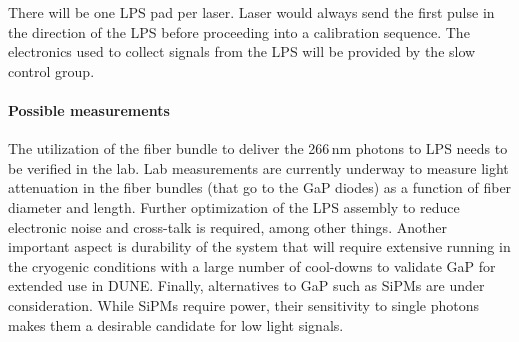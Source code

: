 There will be one LPS pad per laser. Laser would always send the first pulse in the direction of the LPS before proceeding into a calibration sequence.
 The electronics used to collect
signals from the LPS will be provided by the slow control group.

\paragraph{Possible measurements}
The utilization of the fiber bundle to deliver the 266\,nm photons to LPS needs to be verified in the lab. Lab measurements are currently underway to measure light attenuation in the fiber bundles (that go to the GaP diodes) as a function of fiber diameter and length. Further optimization of the LPS assembly to reduce electronic noise and cross-talk is required, among other things. Another important aspect is durability of the system that will require extensive running in the cryogenic conditions with  a large number of cool-downs to validate GaP for extended use in DUNE. Finally, alternatives to GaP such as SiPMs are under consideration. While SiPMs require power, their sensitivity to single photons makes them a desirable candidate for low light signals. 
